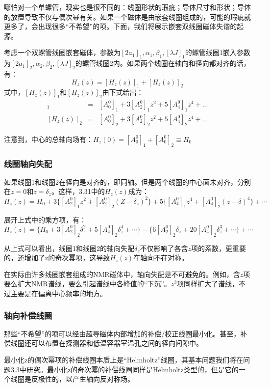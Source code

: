 哪怕对一个单螺管，现实也是很不同的：线圈形状的瑕疵；导体尺寸和形状；导体的放置导致不仅与偶次幂有关。如果一个磁体是由嵌套线圈组成的，可能的瑕疵就更多了，会出现很多“不希望”的项。下面，我们将展示嵌套双线圈磁体失谐的起源。

考虑一个双螺管线圈嵌套磁体，参数为$[2a_1]_1,\alpha_1,\beta_1,[\lambda J]_1$的螺管线圈1嵌入参数为$[2a_1]_2,\alpha_2,\beta_2,[\lambda J]_2$的螺管线圈2内。如果两个线圈在轴向和径向都对齐的话，有：
\begin{equation}
H_z(z)=[H_z(z)]_1+[H_z(z)]_2
\end{equation}
式中，$[H_z(z)]_1$和$[H_z(z)]_2$由下式给出：
\begin{eqnarray}
  [H_z(z)]_1 &=& [A_0^0]_1 +3[A_2^0]_1 z^2+5[A_4^0]_1 z^4+... \\ \nonumber
  [H_z(z)]_2 &=& [A_0^0]_2 +3[A_2^0]_2 z^2+5[A_4^0]_2 z^4+...
\end{eqnarray}

注意到，中心的总轴向场有：$H_z(0)=[A_0^0]_1+[A_0^0]_2\equiv H_0$

\subsubsection{线圈轴向失配}
如果线圈1和线圈2在径向是对齐的，即同轴。但是两个线圈的中心面未对齐，分别在$z=0$和$z=\delta_z$。这样，3.31中的$H_z(z)$成为：
\begin{equation}
  H_z(z)=H_0+3\{ [A_2^0]_1 z^2+[A_2^0]_2(Z-\delta_z)^2\}+5\{[A_4^0]_1 z^4+[A_4^0]_2(z-\delta)^4\}+\cdots
\end{equation}

展开上式中的乘方项，有：
$$H_z(z)=\{H_0+3[A_2^0]_2 \delta_z^2+5[A_4^0]_2\delta_z^4+\cdots\}-\{6[A_2^0]_2\delta_z+20[A_4^0]_2\delta_z^3+\cdots\}+\cdots$$

从上式可以看出，线圈1和线圈2的轴向失配$\delta_z$不仅影响了各含$z$项的系数，更重要的，还增加了z的奇次幂项，这导致$H_z(z)$在轴向不在对称。

在实际由许多线圈嵌套组成的NMR磁体中，轴向失配是不可避免的。例如，含$z$项要么扩大NMR谱线，要么引起谱线中各峰值的“下沉”。$z^3$项同样扩大了谱线，不过主要是在偏离中心频率的地方。

\subsubsection{轴向补偿线圈}
那些“不希望”的项可以经由超导磁体内部增加的补偿/校正线圈最小化。甚至，补偿线圈还可以布置在探测器和低温容器室温孔之间的径向间隙中。

最小化z的偶次幂项的补偿线圈本质上是“Helmholtz”线圈，其基本问题我们将在问题3.3中研究。最小化z的奇次幂的补偿线圈同样是Helmholtz类型的，但是它的一个线圈是反极性的，以产生轴向反对称场。

